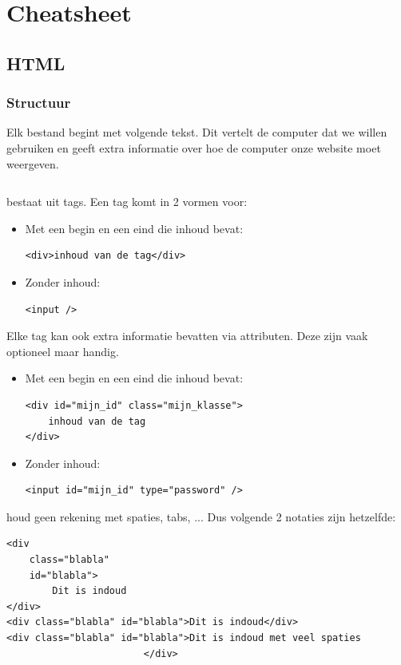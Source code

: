 \chapter{Cheatsheet}%

\section{HTML}%
\label{sec:html}

\subsection{Structuur}%
\label{sub:structuur}

Elk \HTML bestand begint met volgende tekst. Dit vertelt de computer dat we \HTML willen gebruiken en geeft extra informatie over hoe de computer onze website moet weergeven.
\inputminted{html}{../cheatsheet/basis_html.html}

\HTML bestaat uit tags. Een tag komt in 2 vormen voor:
\begin{itemize}
    \item Met een begin en een eind die inhoud bevat:
        \begin{verbatim}
<div>inhoud van de tag</div>
        \end{verbatim}
    \item Zonder inhoud:
        \begin{verbatim}
<input />
        \end{verbatim}
\end{itemize}

Elke tag kan ook extra informatie bevatten via attributen. Deze zijn vaak optioneel maar handig.

\begin{itemize}
    \item Met een begin en een eind die inhoud bevat:
        \begin{verbatim}
<div id="mijn_id" class="mijn_klasse">
    inhoud van de tag
</div>
        \end{verbatim}
    \item Zonder inhoud:
        \begin{verbatim}
<input id="mijn_id" type="password" />
        \end{verbatim}
\end{itemize}

\Opm \HTML houd geen rekening met spaties, tabs, ... Dus volgende 2 notaties zijn hetzelfde:
\begin{verbatim}
<div
    class="blabla"
    id="blabla">
        Dit is indoud
</div>
<div class="blabla" id="blabla">Dit is indoud</div>
<div class="blabla" id="blabla">Dit is indoud met veel spaties
                        </div>
\end{verbatim}

